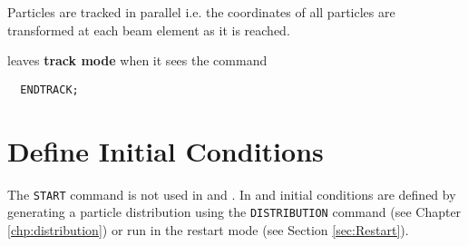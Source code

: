 Particles are tracked in parallel i.e. the coordinates of all particles
are transformed at each beam element as it is reached.

\opal leaves \textbf{track mode} when it sees the command
\begin{verbatim}
  ENDTRACK;
\end{verbatim}



\section{Define Initial Conditions}
\label{sec:trackstart}
The \texttt{START} command is not used in \noopalt and \noopalcycl . In 
\opalt and \opalcycl initial conditions are defined by generating a particle
distribution using the \texttt{DISTRIBUTION} command (see Chapter \ref{chp:distribution}) or
run \opal in the restart mode (see Section \ref{sec:Restart}). 


